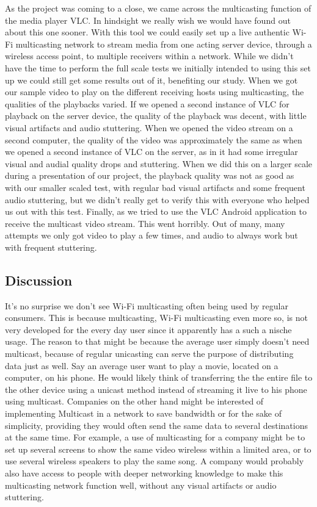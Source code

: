 \documentclass[9pt,a4paper]{acmproc}
\begin{document}
As the project was coming to a close, we came across the multicasting function of the media player VLC. In hindsight we really wish we would have found out about this one sooner. With this tool we could easily set up a live authentic Wi-Fi multicasting network to stream media from one acting server device, through a wireless access point, to multiple receivers within a network. While we didn't have the time to perform the full scale tests we initially intended to using this set up we could still get some results out of it, benefiting our study.
When we got our sample video to play on the different receiving hosts using multicasting, the qualities of the playbacks varied. If we opened a second instance of VLC for playback on the server device, the quality of the playback was decent, with little visual artifacts and audio stuttering. When we opened the video stream on a second computer, the quality of the video was approximately the same as when we opened a second instance of VLC on the server, as in it had some irregular visual and audial quality drops and stuttering. When we did this on a larger scale during a presentation of our project, the playback quality was not as good as with our smaller scaled test, with regular bad visual artifacts and some frequent audio stuttering, but we didn't really get to verify this with everyone who helped us out with this test. Finally, as we tried to use the VLC Android application to receive the multicast video stream. This went horribly. Out of many, many attempts we only got video to play a few times, and audio to always work but with frequent stuttering.

\subsection{Discussion}
It's no surprise we don't see Wi-Fi multicasting often being used by regular consumers. This is because multicasting, Wi-Fi multicasting even more so, is not very developed for the every day user since it apparently has a such a nische usage. The reason to that might be because the average user simply doesn't need multicast, because of regular unicasting can serve the purpose of distributing data just as well. Say an average user want to play a movie, located on a computer, on his phone. He would likely think of transferring the the entire file to the other device using a unicast method instead of streaming it live to his phone using multicast.
Companies on the other hand might be interested of implementing Multicast in a network to save bandwidth or for the sake of simplicity, providing they would often send the same data to several destinations at the same time. For example, a use of multicasting for a company might be to set up several screens to show the same video wireless within a limited area, or to use several wireless speakers to play the same song. A company would probably also have access to people with deeper networking knowledge to make this multicasting network function well, without any visual artifacts or audio stuttering.
\end{document}
